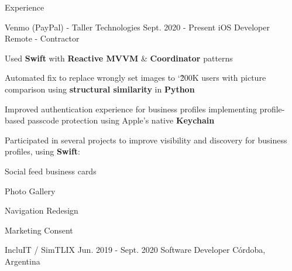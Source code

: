 \documentclass{curriculum}
\begin{document}
\begin{cvsection}{Experience}


    \makesectionitemheader
        {Venmo (PayPal) - Taller Technologies}              {Sept. 2020 - Present}
        {iOS Developer}                                      {Remote - Contractor}

        \begin{sectionitemlist}

        \item{
            Used \textbf{Swift} with \textbf{Reactive MVVM} \& \textbf{Coordinator} patterns
        }
        \item{
            Automated fix to replace wrongly set images to \char`\~ 200K users with
            picture comparison using \textbf{structural similarity} in \textbf{Python}
        }
        \item{
            Improved authentication experience for business profiles implementing
            profile-based passcode protection using Apple's native \textbf{Keychain}
        }
        \item{
            Participated in several projects to improve visibility and discovery
            for business profiles, using \textbf{Swift}:
        }
        {
            \begin{colsectionitemlist}{3}
            \item{Social feed business cards}
            \item{Photo Gallery}
            \item{Navigation Redesign}
            \item{Marketing Consent}
            \end{colsectionitemlist}
        }

        \end{sectionitemlist}


    \makesectionitemheader
        {IncluIT / SimTLIX}                             {Jun. 2019 - Sept. 2020}
        {Software Developer}                                {Córdoba, Argentina}


\end{cvsection}
\end{document}
